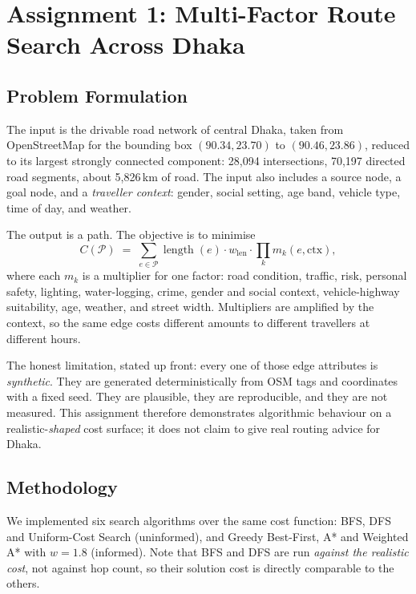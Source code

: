 \documentclass{ai-lab-report}
\begin{document}
\section{Assignment 1: Multi-Factor Route Search Across Dhaka}
\label{sec:a1}

\subsection{Problem Formulation}
The input is the drivable road network of central Dhaka, taken from OpenStreetMap for the
bounding box $(90.34, 23.70)$ to $(90.46, 23.86)$, reduced to its largest strongly connected
component: 28{,}094 intersections, 70{,}197 directed road segments, about 5{,}826\,km of road.
The input also includes a source node, a goal node, and a \emph{traveller context}: gender,
social setting, age band, vehicle type, time of day, and weather.

The output is a path. The objective is to minimise
\begin{equation}
C(\mathcal{P}) \;=\; \sum_{e \in \mathcal{P}} \operatorname{length}(e)\cdot w_{\text{len}}
\cdot \prod_{k} m_k(e, \text{ctx}),
\end{equation}
where each $m_k$ is a multiplier for one factor: road condition, traffic, risk, personal
safety, lighting, water-logging, crime, gender and social context, vehicle-highway
suitability, age, weather, and street width. Multipliers are amplified by the context, so
the same edge costs different amounts to different travellers at different hours.

The honest limitation, stated up front: every one of those edge attributes is
\emph{synthetic}. They are generated deterministically from OSM tags and coordinates with a
fixed seed. They are plausible, they are reproducible, and they are not measured. This
assignment therefore demonstrates algorithmic behaviour on a realistic-\emph{shaped} cost
surface; it does not claim to give real routing advice for Dhaka.

\subsection{Methodology}
We implemented six search algorithms over the same cost function: BFS, DFS and Uniform-Cost
Search (uninformed), and Greedy Best-First, A* and Weighted A* with $w = 1.8$ (informed).
Note that BFS and DFS are run \emph{against the realistic cost}, not against hop count, so
their solution cost is directly comparable to the others.
\end{document}
